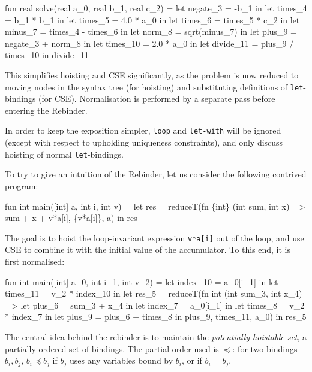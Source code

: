 \begin{colorcode}
fun real solve(real a_0, real b_1, real c_2) =
  let negate_3  = -b_1 in
  let times_4   = b_1 * b_1 in
  let times_5   = 4.0 * a_0 in
  let times_6   = times_5 * c_2 in
  let minus_7   = times_4 - times_6 in
  let norm_8    = sqrt(minus_7) in
  let plus_9    = negate_3 + norm_8 in
  let times_10  = 2.0 * a_0 in
  let divide_11 = plus_9 / times_10 in
  divide_11
\end{colorcode}

This simplifies hoisting and CSE significantly, as the problem is now
reduced to moving nodes in the syntax tree (for hoisting) and
substituting definitions of \texttt{let}-bindings (for CSE).
Normalisation is performed by a separate pass before entering the
Rebinder.

In order to keep the exposition simpler, \texttt{loop} and
\texttt{let-with} will be ignored (except with respect to upholding
uniqueness constraints), and only discuss hoisting of normal
\texttt{let}-bindings.

To try to give an intuition of the Rebinder, let us consider the
following contrived program:

\begin{colorcode}
fun int main([int] a, int i, int v) =
  let {res} =
    reduceT(fn \{int\} (int sum, int x) =>
              {sum + x + v*a[i]},
            \{v*a[i]\}, a) in
  res
\end{colorcode}

The goal is to hoist the loop-invariant expression \texttt{v*a[i]} out
of the loop, and use CSE to combine it with the initial value of the
accumulator.  To this end, it is first normalised:

\begin{colorcode}
fun int main([int] a_0, int i_1, int v_2) =
  let index_10 = a_0[i_1] in
  let times_11 = v_2 * index_10 in
  let {res_5} =
    reduceT(fn {int} (int sum_3, int x_4) =>
              let plus_6 = sum_3 + x_4 in
              let index_7 = a_0[i_1] in
              let times_8 = v_2 * index_7 in
              let plus_9 = plus_6 + times_8 in
              {plus_9},
            {times_11}, a_0) in
  res_5
\end{colorcode}

The central idea behind the rebinder is to maintain the
\textit{potentially hoistable set}, a partially ordered set of
bindings.  The partial order used is $\preceq$: for two bindings
$b_{i}, b_{j}$, $b_{i} \preceq b_{j}$ if $b_{j}$ uses any variables
bound by $b_{i}$, or if $b_{i} = b_{j}$.

